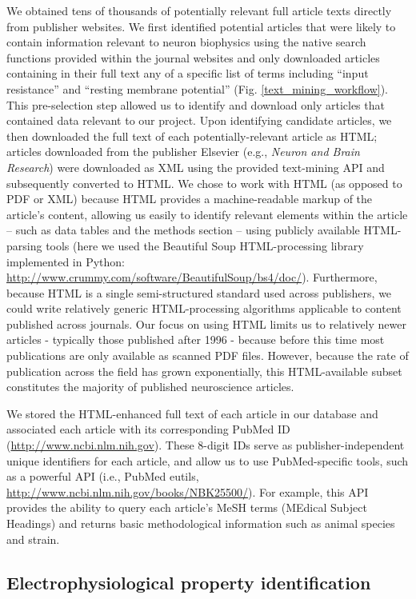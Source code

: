 \documentclass{template/frontiersSCNS} %
\begin{document}
We obtained tens of thousands of potentially relevant full article texts directly from publisher websites.  
We first identified potential articles that were likely to contain information relevant to neuron biophysics using the native search functions provided within the journal websites and only downloaded articles containing in their full text any of a specific list of terms including ``input resistance'' and ``resting membrane potential'' (Fig. \ref{text_mining_workflow}).  
This pre-selection step allowed us to identify and download only articles that contained data relevant to our project.  
Upon identifying candidate articles, we then downloaded the full text of each potentially-relevant article as HTML; 
articles downloaded from the publisher Elsevier (e.g., \emph{Neuron and Brain Research}) were downloaded as XML using the provided text-mining API and subsequently converted to HTML.  
We chose to work with HTML (as opposed to PDF or XML) because HTML provides a machine-readable markup of the article's content, allowing us easily to identify relevant elements within the article -- such as data tables and the methods section -- using publicly available HTML-parsing tools (here we used the Beautiful Soup HTML-processing library implemented in Python: \url{http://www.crummy.com/software/BeautifulSoup/bs4/doc/}).  
Furthermore, because HTML is a single semi-structured standard used across publishers, we could write relatively generic HTML-processing algorithms applicable to content published across journals.  
Our focus on using HTML limits us to relatively newer articles - typically those published after 1996 - because before this time most publications are only available as scanned PDF files.  
However, because the rate of publication across the field has grown exponentially, this HTML-available subset constitutes the majority of published neuroscience articles.

We stored the HTML-enhanced full text of each article in our database and associated each article with its corresponding PubMed ID (\url{http://www.ncbi.nlm.nih.gov}).  
These 8-digit IDs serve as publisher-independent unique identifiers for each article, and allow us to use PubMed-specific tools, such as a powerful API (i.e., PubMed eutils, \url{http://www.ncbi.nlm.nih.gov/books/NBK25500/}).  
For example, this API provides the ability to query each article's MeSH terms (MEdical Subject Headings) and returns basic methodological information such as animal species and strain.

\subsection{Electrophysiological property identification}
\end{document}
